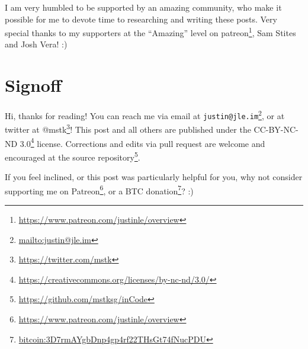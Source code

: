 \documentclass[]{article}
\renewcommand{\href}[2]{#2\footnote{\url{#1}}}
\begin{document}
I am very humbled to be supported by an amazing community, who make it possible
for me to devote time to researching and writing these posts. Very special
thanks to my supporters at the ``Amazing'' level on
\href{https://www.patreon.com/justinle/overview}{patreon}, Sam Stites and Josh
Vera! :)

\section{Signoff}\label{signoff}

Hi, thanks for reading! You can reach me via email at
\href{mailto:justin@jle.im}{\nolinkurl{justin@jle.im}}, or at twitter at
\href{https://twitter.com/mstk}{@mstk}! This post and all others are published
under the \href{https://creativecommons.org/licenses/by-nc-nd/3.0/}{CC-BY-NC-ND
3.0} license. Corrections and edits via pull request are welcome and encouraged
at \href{https://github.com/mstksg/inCode}{the source repository}.

If you feel inclined, or this post was particularly helpful for you, why not
consider \href{https://www.patreon.com/justinle/overview}{supporting me on
Patreon}, or a \href{bitcoin:3D7rmAYgbDnp4gp4rf22THsGt74fNucPDU}{BTC donation}?
:)
\end{document}
